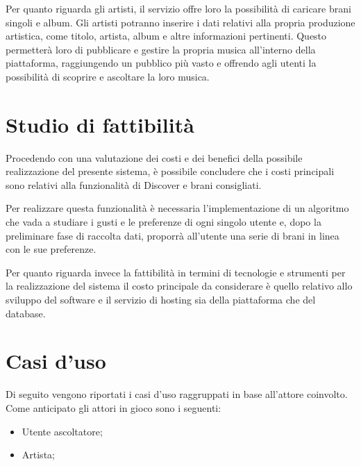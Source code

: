 Per quanto riguarda gli artisti, il servizio offre loro la possibilità di caricare brani singoli e album. 
Gli artisti potranno inserire i dati relativi alla propria produzione artistica, come titolo, artista, album e 
altre informazioni pertinenti. Questo permetterà loro di pubblicare e gestire la propria musica all'interno 
della piattaforma, raggiungendo un pubblico più vasto e offrendo agli utenti la possibilità di scoprire e ascoltare la loro musica.



\vspace{1cm}
\section{Studio di fattibilità}
Procedendo con una valutazione dei costi e dei benefici della possibile realizzazione del
presente sistema, è possibile concludere che i costi principali sono relativi alla
funzionalità di Discover e brani consigliati. 

Per realizzare questa funzionalità è
necessaria l'implementazione di un algoritmo che vada a studiare i gusti e le preferenze
di ogni singolo utente e, dopo la preliminare fase di raccolta dati, proporrà all'utente
una serie di brani in linea con le sue preferenze. 

Per quanto riguarda invece la
fattibilità in termini di tecnologie e strumenti per la realizzazione del sistema 
il costo principale da considerare è quello relativo allo sviluppo del software e il servizio di hosting sia 
della piattaforma che del database. 


\newpage
\section{Casi d'uso}
Di seguito vengono riportati i casi d'uso raggruppati in base all'attore coinvolto. Come
anticipato gli attori in gioco sono i seguenti:
\begin{itemize}
      \item Utente ascoltatore;
      \item Artista;
\end{itemize}

\vspace{0.5cm}
